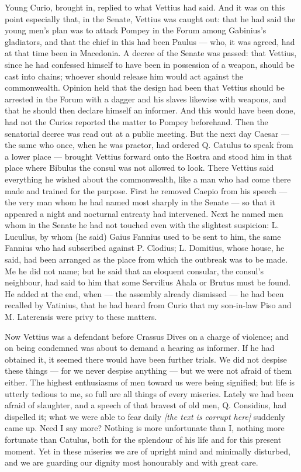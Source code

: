  Young Curio, brought in, replied to what Vettius had said. And it was on this point especially that, in the Senate, Vettius was caught out: that he had said the young men's plan was to attack Pompey in the Forum among Gabinius's gladiators, and that the chief in this had been Paulus --- who, it was agreed, had at that time been in Macedonia. A decree of the Senate was passed: that Vettius, since he had confessed himself to have been in possession of a weapon, should be cast into chains; whoever should release him would act against the commonwealth. Opinion held that the design had been that Vettius should be arrested in the Forum with a dagger and his slaves likewise with weapons, and that he should then declare himself an informer. And this would have been done, had not the Curios reported the matter to Pompey beforehand. Then the senatorial decree was read out at a public meeting. But the next day Caesar --- the same who once, when he was praetor, had ordered Q. Catulus to speak from a lower place --- brought Vettius forward onto the Rostra and stood him in that place where Bibulus the consul was not allowed to look. There Vettius said everything he wished about the commonwealth, like a man who had come there made and trained for the purpose. First he removed Caepio from his speech --- the very man whom he had named most sharply in the Senate --- so that it appeared a night and nocturnal entreaty had intervened. Next he named men whom in the Senate he had not touched even with the slightest suspicion: L. Lucullus, by whom (he said) Gaius Fannius used to be sent to him, the same Fannius who had subscribed against P. Clodius; L. Domitius, whose house, he said, had been arranged as the place from which the outbreak was to be made. Me he did not name; but he said that an eloquent consular, the consul's neighbour, had said to him that some Servilius Ahala or Brutus must be found. He added at the end, when --- the assembly already dismissed --- he had been recalled by Vatinius, that he had heard from Curio that my son-in-law Piso and M. Laterensis were privy to these matters.

 Now Vettius was a defendant before Crassus Dives on a charge of violence; and on being condemned was about to demand a hearing as informer. If he had obtained it, it seemed there would have been further trials. We did not despise these things --- for we never despise anything --- but we were not afraid of them either. The highest enthusiasms of men toward us were being signified; but life is utterly tedious to me, so full are all things of every miseries. Lately we had been afraid of slaughter, and a speech of that bravest of old men, Q. Considius, had dispelled it; what we were able to fear daily \textit{[the text is corrupt here]} suddenly came up. Need I say more? Nothing is more unfortunate than I, nothing more fortunate than Catulus, both for the splendour of his life and for this present moment. Yet in these miseries we are of upright mind and minimally disturbed, and we are guarding our dignity most honourably and with great care.

